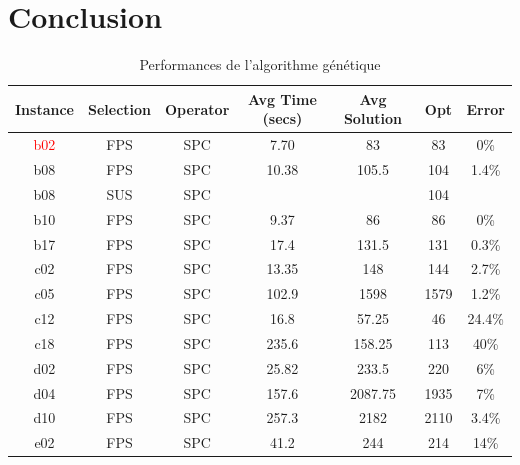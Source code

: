 \documentclass[10pt]{article}
\begin{document}
\section{Conclusion}


	\begin{table}[h!]
		\centering
		\begin{tabular}{|c|c|c|c|c|c|c|}
		\hline
\textbf{Instance} & \textbf{Selection} & \textbf{Operator} & \textbf{Avg Time (secs)} & \textbf{Avg Solution} & \textbf{Opt} & \textbf{Error} \\
\hline
\textcolor{red}{b02} & FPS & SPC & 7.70 & 83 & 83 & 0\% \\
b08 & FPS & SPC & 10.38 & 105.5 & 104 & 1.4\% \\
b08 & SUS & SPC & & & 104 & \\
b10 & FPS & SPC & 9.37 & 86 & 86 & 0\% \\

b17 & FPS & SPC & 17.4 & 131.5 & 131 & 0.3\% \\

c02 & FPS & SPC & 13.35 & 148 & 144 & 2.7\% \\

c05 & FPS & SPC & 102.9 & 1598 & 1579 & 1.2\% \\

c12 & FPS & SPC & 16.8 & 57.25 & 46 & 24.4\% \\

c18 & FPS & SPC & 235.6 & 158.25 & 113 & 40\% \\

d02 & FPS & SPC & 25.82 & 233.5 & 220 & 6\% \\

d04 & FPS & SPC & 157.6 & 2087.75 & 1935 & 7\% \\

d10 & FPS & SPC & 257.3 & 2182 & 2110 & 3.4\% \\

e02 & FPS & SPC & 41.2 & 244 & 214 & 14\% \\
		\end{tabular}
		\caption{Performances de l'algorithme génétique}
		\label{tab-perfgen}
	\end{table}
	
\end{document}
